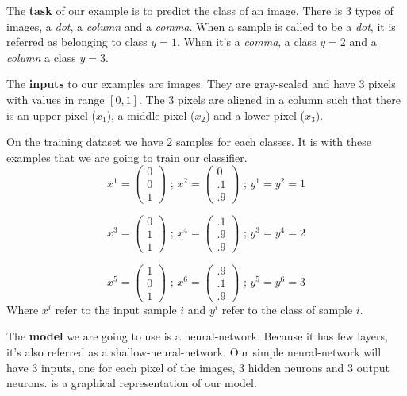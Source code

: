 		The \textbf{task} of our example is to predict the class of an image. There is 3 types of images, a \textit{dot}, a \textit{column} and a \textit{comma}. When a sample is called to be a \textit{dot}, it is referred as belonging to class $y=1$. When it's a \textit{comma}, a class $y=2$ and a \textit{column} a class $y=3$.

		The \textbf{inputs} to our examples are images. They are gray-scaled and have 3 pixels with values in range $[0,1]$. The 3 pixels are aligned in a column such that there is an upper pixel ($x_1$), a middle pixel ($x_2$) and a lower pixel ($x_3$). 

		On the training dataset we have 2 samples for each classes. It is with these examples that we are going to train our classifier.
		$$ x^1 = \left( \begin{matrix} 0  \\ 0  \\ 1  \end{matrix}\right) \text{ ; }
		   x^2 = \left( \begin{matrix} 0  \\ .1 \\ .9 \end{matrix}\right) \text{ ; }
		   y^1 = y^2 = 1 $$

		$$ x^3 = \left( \begin{matrix} 0  \\ 1  \\ 1  \end{matrix}\right) \text{ ; }
		   x^4 = \left( \begin{matrix} .1 \\ .9 \\ .9 \end{matrix}\right) \text{ ; }
		   y^3 = y^4 = 2 $$

		$$ x^5 = \left( \begin{matrix} 1  \\ 0  \\ 1  \end{matrix}\right) \text{ ; }
		   x^6 = \left( \begin{matrix} .9 \\ .1 \\ .9 \end{matrix}\right) \text{ ; }
		   y^5 = y^6 = 3 $$
		Where $x^i$ refer to the input sample $i$ and $y^i$ refer to the class of sample $i$.

		The \textbf{model} we are going to use is a neural-network. Because it has few layers, it's also referred as a shallow-neural-network. Our simple neural-network will have 3 inputs, one for each pixel of the images, 3 hidden neurons and 3 output neurons.  is a graphical representation of our model.

